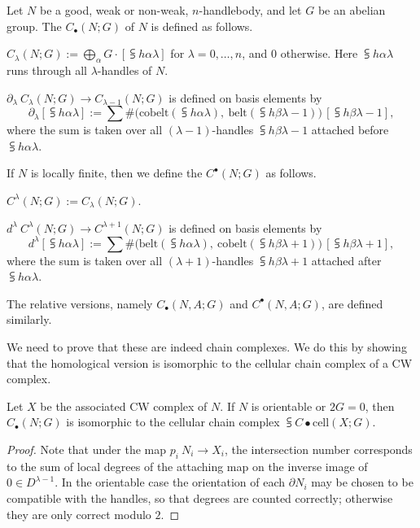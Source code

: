 \begin{definition}
Let $N$ be a good, weak or non-weak, $n$-handlebody,
and let $G$ be an abelian group.
The  $C_\bullet(N;G)$ of $N$ is defined as follows.
\begin{itms}
\item $C_\lambda(N;G):=\bigoplus_\alpha G\cdot[\subsup h\alpha\lambda]$
for $\lambda=0,\dotsc,n$, and $0$ otherwise.
Here $\subsup h\alpha\lambda$ runs through all $\lambda$-handles of $N$.
\item $\partial_\lambda\:C_\lambda(N;G)\to C_{\lambda-1}(N;G)$ is defined on basis elements by
\[\partial_\lambda[\subsup h\alpha\lambda]:=\sum\#\bigl(\text{cobelt}(\subsup h\alpha\lambda),\ \text{belt}(\subsup h\beta{\lambda-1})\bigr)\,[\subsup h\beta{\lambda-1}],\]
where the sum is taken over all $(\lambda-1)$-handles $\subsup h\beta{\lambda-1}$
attached before $\subsup h\alpha\lambda$.
\end{itms}
If $N$ is locally finite, then we define the 
$C^\bullet(N;G)$ as follows.
\begin{itms}
\item $C^\lambda(N;G):=C_\lambda(N;G)$.
\item $d^\lambda\:C^\lambda(N;G)\to C^{\lambda+1}(N;G)$ is defined on basis elements by
\[d^\lambda[\subsup h\alpha\lambda]:=\sum\#\bigl(\text{belt}(\subsup h\alpha\lambda),\ \text{cobelt}(\subsup h\beta{\lambda+1})\bigr)\,[\subsup h\beta{\lambda+1}],\]
where the sum is taken over all $(\lambda+1)$-handles $\subsup h\beta{\lambda+1}$
attached after $\subsup h\alpha\lambda$.
\end{itms}
The relative versions, 
namely $C_\bullet(N,A;G)$ and $C^\bullet(N,A;G)$, are defined similarly. \varqed
\end{definition}

We need to prove that these are indeed chain complexes.
We do this by showing that the homological version
is isomorphic to the cellular chain complex
of a CW complex.

\begin{proposition}
Let $X$ be the associated CW complex of $N$.
If $N$ is orientable or $2G=0$,
then $C_\bullet(N;G)$ is isomorphic to the
cellular chain complex $\subsup C\bullet{\mathrm{cell}}(X;G)$.
\end{proposition}

\begin{proof}
Note that under the map $p_i\:N_i\to X_i$,
the intersection number corresponds to the
sum of local degrees
of the attaching map on the inverse image of $0\in D^{\lambda-1}$.
In the orientable case the orientation of each $\partial N_i$
may be chosen to be compatible with the handles,
so that degrees are counted correctly;
otherwise they are only correct modulo $2$.
\end{proof}

